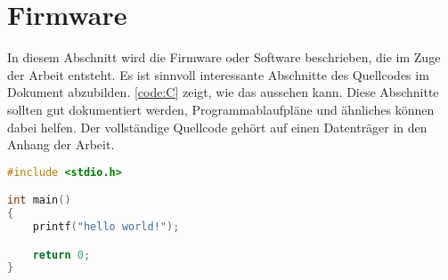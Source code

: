 

\section{Firmware}
	
In diesem Abschnitt wird die Firmware oder Software beschrieben, die im Zuge der Arbeit entsteht. Es ist sinnvoll interessante Abschnitte des Quellcodes im Dokument abzubilden. \autoref{code:C} zeigt, wie das aussehen kann. Diese Abschnitte sollten gut dokumentiert werden, Programmablaufpläne und ähnliches können dabei helfen. Der vollständige Quellcode gehört auf einen Datenträger in den Anhang der Arbeit.


\begin{lstlisting}[language=c, caption={C Beispiel}, label=code:C]
#include <stdio.h>

int main()
{
	printf("hello world!");                    

	return 0;
}
\end{lstlisting}